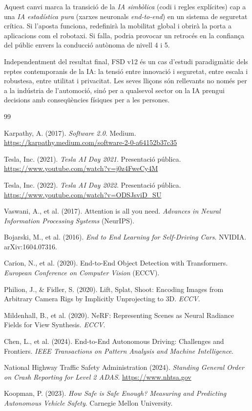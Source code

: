 \documentclass[11pt,a4paper]{article}
\begin{document}
Aquest canvi marca la transició de la \emph{IA simbòlica} (codi i regles explícites) cap a una \emph{IA estadística pura} (xarxes neuronals \emph{end-to-end}) en un sistema de seguretat crítica. Si l'aposta funciona, redefinirà la mobilitat global i obrirà la porta a aplicacions com el robotaxi. Si falla, podria provocar un retrocés en la confiança del públic envers la conducció autònoma de nivell 4 i 5.

Independentment del resultat final, FSD v12 és un cas d'estudi paradigmàtic dels reptes contemporanis de la IA: la tensió entre innovació i seguretat, entre escala i robustesa, entre utilitat i privacitat. Les seves lliçons són rellevants no només per a la indústria de l'automoció, sinó per a qualsevol sector on la IA prengui decisions amb conseqüències físiques per a les persones.

\begin{thebibliography}{99}

 Karpathy, A. (2017). \emph{Software 2.0}. Medium. \url{https://karpathy.medium.com/software-2-0-a64152b37c35}

 Tesla, Inc. (2021). \emph{Tesla AI Day 2021}. Presentació pública. \url{https://www.youtube.com/watch?v=j0z4FweCy4M}

 Tesla, Inc. (2022). \emph{Tesla AI Day 2022}. Presentació pública. \url{https://www.youtube.com/watch?v=ODSJsviD_SU}

 Vaswani, A., et al. (2017). Attention is all you need. \emph{Advances in Neural Information Processing Systems} (NeurIPS).

 Bojarski, M., et al. (2016). \emph{End to End Learning for Self-Driving Cars}. NVIDIA. arXiv:1604.07316.

 Carion, N., et al. (2020). End-to-End Object Detection with Transformers. \emph{European Conference on Computer Vision} (ECCV).

 Philion, J., \& Fidler, S. (2020). Lift, Splat, Shoot: Encoding Images from Arbitrary Camera Rigs by Implicitly Unprojecting to 3D. \emph{ECCV}.

 Mildenhall, B., et al. (2020). NeRF: Representing Scenes as Neural Radiance Fields for View Synthesis. \emph{ECCV}.

 Chen, L., et al. (2024). End-to-End Autonomous Driving: Challenges and Frontiers. \emph{IEEE Transactions on Pattern Analysis and Machine Intelligence}.

 National Highway Traffic Safety Administration (2024). \emph{Standing General Order on Crash Reporting for Level 2 ADAS}. \url{https://www.nhtsa.gov}

 Koopman, P. (2023). \emph{How Safe is Safe Enough? Measuring and Predicting Autonomous Vehicle Safety}. Carnegie Mellon University.

\end{thebibliography}
\end{document}
